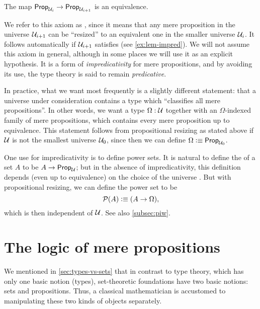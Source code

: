 \begin{axiom}
  The map $\mathsf{Prop}_{\mathcal{U}_i} \to \mathsf{Prop}_{\mathcal{U}_{i+1}}$ is an equivalence.
\end{axiom}

We refer to this axiom as ,
since it means that any mere proposition in the universe $\mathcal{U}_{i+1}$ can be ``resized'' to an equivalent one in the smaller universe $\mathcal{U}_i$.
It follows automatically if $\mathcal{U}_{i+1}$ satisfies \LEM{} (see \autoref{ex:lem-impred}).
We will not assume this axiom in general, although in some places we will use it as an explicit hypothesis.
It is a form of \emph{impredicativity} for mere propositions, and by avoiding its use, the type theory is said to remain \emph{predicative}.
%
%

In practice, what we want most frequently is a slightly different statement: that a universe \UU under consideration contains a type which ``classifies all mere propositions''.
In other words, we want a type $\Omega:\mathcal{U}$ together with an $\Omega$-indexed family of mere propositions, which contains every mere proposition up to equivalence.
This statement follows from propositional resizing as stated above if $\mathcal{U}$ is not the smallest universe $\mathcal{U}_0$, since then we can define $\Omega\vcentcolon\equiv \mathsf{Prop}_{\mathcal{U}_0}$.

One use for impredicativity is to define power sets.
It is natural to define the  of a set $A$ to be $A\to\mathsf{Prop}_\mathcal{U}$; but in the absence of impredicativity, this definition depends
(even up to equivalence) on the choice of the universe \UU.
But with propositional resizing, we can define the power set to be
%
\[ \mathcal{P}(A) \vcentcolon\equiv (A\to\Omega),\]
which is then independent of $\mathcal{U}$.
See also \autoref{subsec:piw}.


\section{The logic of mere propositions}
\label{subsec:logic-hprop}

%
We mentioned in \autoref{sec:types-vs-sets} that in contrast to type theory, which has only one basic notion (types), set-theoretic foundations have two basic notions: sets and propositions.
Thus, a classical mathematician is accustomed to manipulating these two kinds of objects separately.

